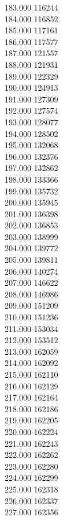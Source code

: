 { 183.000	116244 \\
 184.000	116852 \\
 185.000	117161 \\
 186.000	117577 \\
 187.000	121557 \\
 188.000	121931 \\
 189.000	122329 \\
 190.000	124913 \\
 191.000	127309 \\
 192.000	127574 \\
 193.000	128077 \\
 194.000	128502 \\
 195.000	132068 \\
 196.000	132376 \\
 197.000	132862 \\
 198.000	133366 \\
 199.000	135732 \\
 200.000	135945 \\
 201.000	136398 \\
 202.000	136853 \\
 203.000	138999 \\
 204.000	139772 \\
 205.000	139811 \\
 206.000	140274 \\
 207.000	146622 \\
 208.000	146986 \\
 209.000	151209 \\
 210.000	151236 \\
 211.000	153034 \\
 212.000	153512 \\
 213.000	162059 \\
 214.000	162092 \\
 215.000	162110 \\
 216.000	162129 \\
 217.000	162164 \\
 218.000	162186 \\
 219.000	162205 \\
 220.000	162224 \\
 221.000	162243 \\
 222.000	162262 \\
 223.000	162280 \\
 224.000	162299 \\
 225.000	162318 \\
 226.000	162337 \\
 227.000	162356 \\
}
